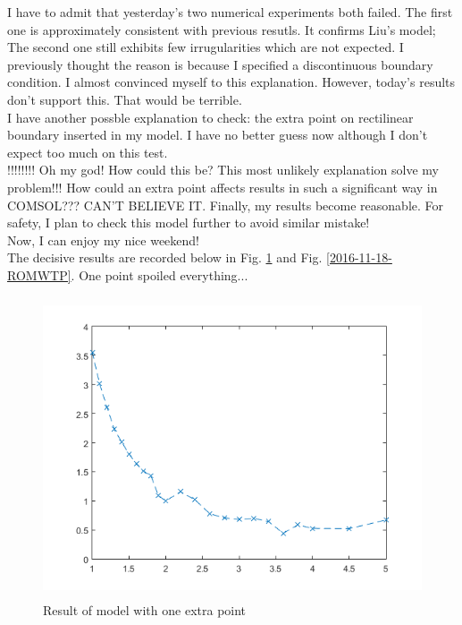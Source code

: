 \documentclass[fontsize=11pt, %
                             paper=a4, %
                             twoside, %
                             captions=tableheading,
                             index=totoc,
                             hyperref]{labbook}
\begin{document}
\begin{addmargin}[4cm]{0cm}
I have to admit that yesterday's two numerical experiments both failed. The first one is approximately consistent with previous resutls. It confirms Liu's model; The second one still exhibits few irrugularities which are not expected. I previously thought the reason is because I specified a discontinuous boundary condition. I almost convinced myself to this explanation. However, today's results don't support this. That would be terrible.\\
I have another possble explanation to check: the extra point on rectilinear boundary inserted in my model. I have no better guess now although I don't expect too much on this test.\\
!!!!!!!! Oh my god! How could this be? This most unlikely explanation solve my problem!!! How could an extra point affects results in such a significant way in COMSOL??? CAN'T BELIEVE IT. Finally, my results become reasonable. For safety, I plan to check this model further to avoid similar mistake! \\
Now, I can enjoy my nice weekend! \\
The decisive results are recorded below in Fig. \ref{2016-11-18-ROMWOEP} and Fig. \ref{2016-11-18-ROMWTP}. One point spoiled everything...
\begin{figure}
\centering
\includegraphics[width=\linewidth, height=3.5in]{2016-11-18-SourceSink.png}
\caption{Result of model with one extra point}\label{2016-11-18-ROMWOEP}
\end{figure}
\begin{figure}
\centering

\end{figure}
\end{addmargin}
\end{document}
